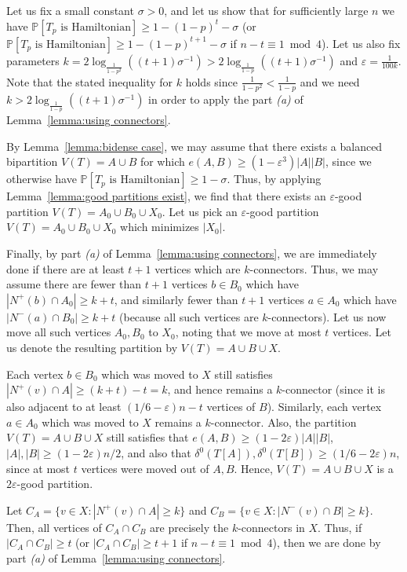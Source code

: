 \documentclass[a4paper,11pt]{article}
\makeatletter
\renewenvironment{proof}[1][\proofname] {\par\pushQED{\qed}\normalfont\topsep6\p@\@plus6\p@\relax\trivlist\item[\hskip\labelsep\textit{#1}\@addpunct{.}]\ignorespaces}{\popQED\endtrivlist\@endpefalse}
\theoremstyle{definition}
\def\eps{\varepsilon}
\def\Pb{\mathbb{P}}
\makeatother
\begin{document}
\begin{proof}[Proof of Theorem~\ref{thm:main}.]

Let us fix a small constant $\sigma>0$, and let us show that for sufficiently large $n$ we have $\Pb[T_p\text{ is Hamiltonian}]\geq 1-(1-p)^t-\sigma$ (or $\Pb[T_p\text{ is Hamiltonian}]\geq 1-(1-p)^{t+1}-\sigma$ if $n-t\equiv 1\bmod 4$). Let us also fix parameters $k=2\log_{\frac{1}{1-p^2}}((t+1)\sigma^{-1})>2\log_{\frac{1}{1-p}}((t+1)\sigma^{-1})$ and $\eps=\frac{1}{100k}$. Note that the stated inequality for $k$ holds since $\frac{1}{1-p^2}<\frac{1}{1-p}$ and we need $k>2\log_{\frac{1}{1-p}}((t+1)\sigma^{-1})$ in order to apply the part \textit{(a)} of Lemma~\ref{lemma:using connectors}.

By Lemma~\ref{lemma:bidense case}, we may assume that there exists a balanced bipartition $V(T)=A\cup B$ for which $e(A, B)\geq (1-\eps^3) |A||B|$, since we otherwise have $\Pb[T_p\text{ is Hamiltonian}]\geq 1-\sigma$. Thus, by applying Lemma~\ref{lemma:good partitions exist}, we find that there exists an $\eps$-good partition $V(T)=A_0\cup B_0\cup X_0$. Let us pick an $\eps$-good partition $V(T)=A_0\cup B_0\cup X_0$ which minimizes $|X_0|$. 

Finally, by part \textit{(a)} of Lemma~\ref{lemma:using connectors}, we are immediately done if there are at least $t+1$ vertices which are $k$-connectors. Thus, we may assume there are fewer than $t+1$ vertices $b\in B_0$ which have $|N^+(b)\cap A_0|\geq k+t$, and similarly fewer than $t+1$ vertices $a\in A_0$ which have $|N^-(a)\cap B_0|\geq k+t$ (because all such vertices are $k$-connectors). Let us now move all such vertices $A_0, B_0$ to $X_0$, noting that we move at most $t$ vertices. Let us denote the resulting partition by $V(T)=A\cup B\cup X$. 

Each vertex $b\in B_0$ which was moved to $X$ still satisfies $|N^+(v)\cap A|\geq (k+t)-t=k$, and hence remains a $k$-connector (since it is also adjacent to at least $(1/6-\eps)n-t$ vertices of $B$). Similarly, each vertex $a\in A_0$ which was moved to $X$ remains a $k$-connector. Also, the partition $V(T)=A\cup B\cup X$ still satisfies that $e(A, B)\geq (1-2\eps)|A||B|$,  $|A|, |B|\geq (1-2\eps) n/2$, and also that $\delta^0(T[A]), \delta^0(T[B])\geq (1/6-2\eps)n$, since at most $t$ vertices were moved out of $A, B$. Hence, $V(T)=A\cup B\cup X$ is a $2\eps$-good partition.

Let $C_A=\{v\in X: |N^+(v)\cap A|\geq k\}$ and $C_B=\{v\in X: |N^-(v)\cap B|\geq k\}$. Then, all vertices of $C_A\cap C_B$ are precisely the $k$-connectors in $X$. Thus, if $|C_A\cap C_B|\geq t$ (or $|C_A\cap C_B|\geq t+1$ if $n-t\equiv 1\bmod 4$), then we are done by part \textit{(a)} of Lemma~\ref{lemma:using connectors}. 


\end{proof}
\end{document}
